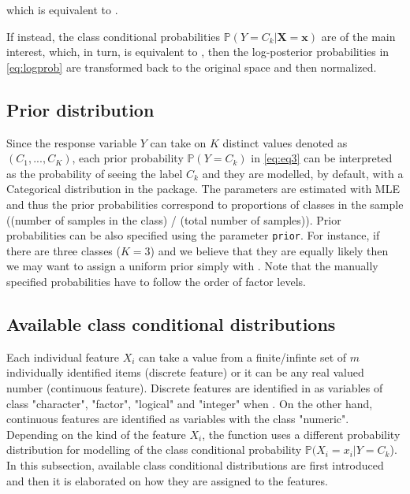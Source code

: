 \documentclass{article}\usepackage[]{graphicx}\usepackage[]{color}
\begin{document}
which is equivalent to  \textcolor{darkgreen}{{}}.

\vspace{3mm}

If instead, the class conditional probabilities $\mathbb{P}(Y = C_k | \boldsymbol{X} = \boldsymbol{x})$ are of the main interest, which, in turn, is equivalent to \textcolor{darkgreen}{{}}, then the log-posterior probabilities in \eqref{eq:logprob} are transformed back to the original space and then normalized.


\label{subsection:prior_distribution}
\subsection{Prior distribution}

Since the response variable $Y$ can take on $K$ distinct values denoted as $(C_1,...,C_K)$, each prior probability $\mathbb{P}(Y = C_k)$ in \eqref{eq:eq3} can be interpreted as the probability of seeing the label $C_k$ and they are modelled, by default, with a Categorical distribution in the \textcolor{darkgreen}{{}} package. The parameters are estimated with MLE and thus the prior probabilities correspond to proportions of classes in the sample ((number of samples in the class) / (total number of samples)). Prior probabilities can be also specified using the parameter \texttt{prior}. For instance, if there are three classes ($K=3$) and we believe that they are equally likely then we may want to assign a uniform prior simply with \textcolor{darkgreen}{{}}.  Note that the manually specified probabilities have to follow the order of factor levels.


\subsection{Available class conditional distributions}

Each individual feature $X_i$ can take a value from a finite/infinte set of $m$ individually identified items (discrete feature) or it can be any real valued number (continuous feature). Discrete features are identified in \textcolor{darkgreen}{{}} as variables of class "character", "factor", "logical" and "integer" when \textcolor{darkgreen}{{}}. On the other hand, continuous features are identified as variables with the class "numeric". Depending on the kind of the feature $X_i$, the \textcolor{darkgreen}{{}} function uses a different probability distribution for modelling of the class conditional probability $\mathbb{P}(X_i = x_i | Y = C_k$). In this subsection, available class conditional distributions are first introduced and then it is elaborated on how they are assigned to the features.
\end{document}
